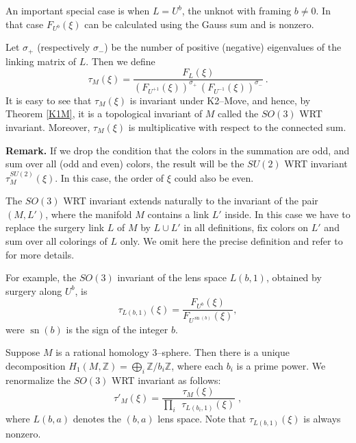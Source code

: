 \documentclass[12pt]{amsart}
\theoremstyle{plain}
\theoremstyle{definition}
\def\BZ{\mathbb Z}
\newcommand{\sn}{\operatorname{sn}}
\def\Z{\BZ}
\begin{document}
An important special case is when $L=U^b$, the unknot with framing
$b \neq 0$. In that case $F_{U^{b}}(\xi)$ can be calculated
using the Gauss sum and is nonzero.

 Let $\sigma_+ $ (respectively $\sigma_-$) be the number of
positive (negative) eigenvalues of the linking matrix of $L$.
 Then we define
\begin{equation}
\tau_{M}(\xi) =
\frac{F_{L}(\xi)}{(F_{U^{+1}}(\xi))^{\sigma_+}\,
(F_{U^{-1}}(\xi))^{\sigma_-} }\, .
\label{def_qi}
\end{equation}
It is easy to see that  $\tau_M(\xi)$ is invariant under
K2--Move, and hence, by Theorem \ref{K1M}, it is a topological
invariant of $M$ called the $SO(3)$ WRT invariant.
 Moreover,
 $\tau_{M}(\xi)$ is multiplicative with
respect to the connected sum.

\vskip2mm
\noindent
{\bf Remark.}
If we drop the condition that the colors in the summation are
odd, and sum over all (odd and even) colors, the result will be
the $SU(2)$ WRT invariant  $\tau^{SU(2)}_M (\xi)$.
In this case, the order of $\xi$ could also be even.
\vskip2mm

 The $SO(3)$  WRT invariant  extends naturally to the invariant
of the pair $(M,L')$, where
the manifold $M$ contains a link $L'$ inside. In this case we have
to replace the surgery link $L$ of $M$ by $L\cup L'$ in all definitions,
fix colors on $L'$ and sum over all colorings of
$L$ only. We omit here the precise definition and refer to \cite{BBL}
for more details.


For example, the $SO(3)$ invariant of the lens space $L(b,1)$,
obtained by surgery along $U^b$,  is
\begin{equation} \tau_{L(b,1)} (\xi)= \frac{ F_{U^b}(\xi)}{F_{U^{\sn(b)}}(\xi) },
\label{2005}
\end{equation}
were $\sn(b)$ is the sign of the integer $b$.






Suppose
$M$ is a rational homology
3--sphere.
Then there is a unique decomposition
 $ H_1(M,\Z)=\bigoplus_{i}
\Z/{b_{i}\Z}$, where each $b_i$ is a prime power.
We renormalize the $SO(3)$  WRT invariant  as follows:
\begin{equation}
\tau'_{M}(\xi)=\frac{\tau_{M}(\xi)}
{\prod\limits_{i}\;\,
\tau_{L(b_{i},1)}(\xi)}\; ,
\label{0910}
\end{equation}
where $L(b,a)$ denotes the $(b,a)$ lens space. Note that
$\tau_{L(b,1)}(\xi)$ is always nonzero.
\end{document}
